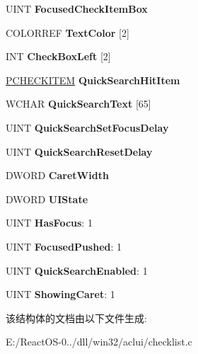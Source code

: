\begin{DoxyCompactItemize}
U\+I\+NT {\bfseries Focused\+Check\+Item\+Box}
\item 
\mbox{\label{struct___c_h_e_c_k_l_i_s_t_w_n_d_a30a455c95a8ebeab7ba7125bef104d38}} 
C\+O\+L\+O\+R\+R\+EF {\bfseries Text\+Color} \mbox{[}2\mbox{]}
\item 
\mbox{\label{struct___c_h_e_c_k_l_i_s_t_w_n_d_a00d318ea562c2f861fa651554e661d97}} 
I\+NT {\bfseries Check\+Box\+Left} \mbox{[}2\mbox{]}
\item 
\mbox{\label{struct___c_h_e_c_k_l_i_s_t_w_n_d_a453b9938abeecebd740346ea9115fd86}} 
\hyperlink{struct___c_h_e_c_k_i_t_e_m}{P\+C\+H\+E\+C\+K\+I\+T\+EM} {\bfseries Quick\+Search\+Hit\+Item}
\item 
\mbox{\label{struct___c_h_e_c_k_l_i_s_t_w_n_d_a45f6e2c0554c99ddd2c7c73773aad008}} 
W\+C\+H\+AR {\bfseries Quick\+Search\+Text} \mbox{[}65\mbox{]}
\item 
\mbox{\label{struct___c_h_e_c_k_l_i_s_t_w_n_d_ac32cf8fca99a1576c04c647f27d6cb61}} 
U\+I\+NT {\bfseries Quick\+Search\+Set\+Focus\+Delay}
\item 
\mbox{\label{struct___c_h_e_c_k_l_i_s_t_w_n_d_a381098c87c1ef24e49abd79e2f95e9ba}} 
U\+I\+NT {\bfseries Quick\+Search\+Reset\+Delay}
\item 
\mbox{\label{struct___c_h_e_c_k_l_i_s_t_w_n_d_a01ecf96d1d8c9c2681d92543bf3c3a7f}} 
D\+W\+O\+RD {\bfseries Caret\+Width}
\item 
\mbox{\label{struct___c_h_e_c_k_l_i_s_t_w_n_d_ab52bf082abbadf3ec05bd9e2a895205b}} 
D\+W\+O\+RD {\bfseries U\+I\+State}
\item 
\mbox{\label{struct___c_h_e_c_k_l_i_s_t_w_n_d_a3b7ae9d8e81fc06a9a147dbc1f9cb5ea}} 
U\+I\+NT {\bfseries Has\+Focus}\+: 1
\item 
\mbox{\label{struct___c_h_e_c_k_l_i_s_t_w_n_d_a16d563cf236078cf14015b1413d27206}} 
U\+I\+NT {\bfseries Focused\+Pushed}\+: 1
\item 
\mbox{\label{struct___c_h_e_c_k_l_i_s_t_w_n_d_ae19fe65067e9be90186d727b0db5227d}} 
U\+I\+NT {\bfseries Quick\+Search\+Enabled}\+: 1
\item 
\mbox{\label{struct___c_h_e_c_k_l_i_s_t_w_n_d_a09c3761e553f7594128075c28598a7bb}} 
U\+I\+NT {\bfseries Showing\+Caret}\+: 1
\end{DoxyCompactItemize}


该结构体的文档由以下文件生成\+:\begin{DoxyCompactItemize}
\item 
E\+:/\+React\+O\+S-\/0../dll/win32/aclui/checklist.\+c\end{DoxyCompactItemize}
